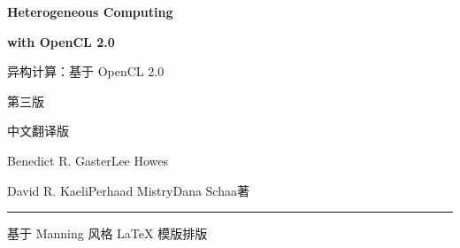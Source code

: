\thispagestyle{empty}
\begingroup
\centering
\vspace*{1.5cm}
{\sffamily\fontsize{28bp}{34bp}\selectfont\bfseries\color{chapterblue} Heterogeneous Computing\par}
\vspace{4bp}
{\sffamily\fontsize{28bp}{34bp}\selectfont\bfseries\color{chapterblue} with OpenCL 2.0\par}
\vspace{14bp}
{\fontsize{17bp}{24bp}\selectfont 异构计算：基于 OpenCL 2.0\par}
\vspace{4bp}
{\fontsize{12bp}{17bp}\selectfont 第三版\par}
\vspace{4bp}
{\fontsize{12bp}{17bp}\selectfont 中文翻译版\par}

\vspace{40bp}
{\fontsize{13bp}{19bp}\selectfont Benedict R. Gaster\quad Lee Howes\par}
\vspace{4bp}
{\fontsize{13bp}{19bp}\selectfont David R. Kaeli\quad Perhaad Mistry\quad Dana Schaa\quad 著\par}

\vfill
{\color{chapterblue}\rule{0.62\textwidth}{1.4bp}\par}
\vspace{10bp}
{\fontsize{11bp}{15bp}\selectfont 基于 Manning 风格 \LaTeX{} 模版排版\par}
\endgroup
